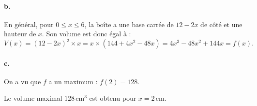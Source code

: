 \documentclass[10pt]{article}
\begin{document}
\paragraph{b.} En général, pour \( 0 \leqslant x \leqslant 6 \), la boîte a une base carrée de \( 12 - 2x \) de côté et une hauteur de \( x \). Son volume est donc égal à :
\[
V(x) = (12 - 2x)^2 \times x = x \times (144 + 4x^2 - 48x) = 4x^3 - 48x^2 + 144x = f(x).
\]

\paragraph{c.} On a vu que \( f \) a un maximum : \( f(2) = 128 \).

Le volume maximal \( 128 \, \text{cm}^3 \) est obtenu pour \( x = 2 \, \text{cm} \).
\end{document}
